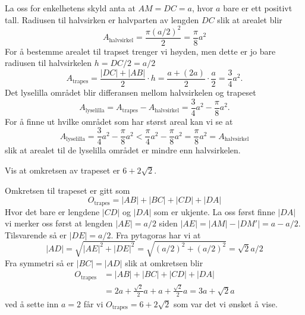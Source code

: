 \begin{losninger}
    La oss for enkelhetens skyld anta at $AM = DC = a$, hvor $a$ bare er ett
    positivt tall. Radiusen til halvsirken er halvparten av lengden $DC$ slik
    at arealet blir
    \begin{equation*}
          A_{\text{halvsirkel}}
        = \frac{\pi (a/2)^2}{2}
        = \frac{\pi}{8} a^2
    \end{equation*}
    For å bestemme arealet til trapset trenger vi høyden, men dette er jo bare
    radiusen til halvsirkelen $h = DC/2 = a/2$
    \begin{equation*}
        A_{\text{trapes}}
        = \frac{|DC| + |AB|}{2} \cdot h
        = \frac{a + (2a)}{2} \cdot \frac{a}{2}
        = \frac{3}{4}a^2.
    \end{equation*}
    Det lyselilla området blir differansen mellom halvsirkelen og trapeset
    \begin{equation*}
        A_{\text{lyselilla}}
        = A_{\text{trapes}} - A_{\text{halvsirkel}}
        = \frac{3}{4}a^2 - \frac{\pi}{8} a^2.
    \end{equation*}
    For å finne ut hvilke området som har størst areal kan vi se at
    \begin{equation*}
           A_{\text{lyselilla}}
        = \frac{3}{4}a^2 - \frac{\pi}{8} a^2
        < \frac{\pi}{4}a^2 - \frac{\pi}{8} a^2
        = \frac{\pi}{8} a^2
        =  A_{\text{halvsirkel}}
    \end{equation*}
    slik at arealet til de lyselilla området er mindre enn halvsirkelen.
\end{losninger}

\begin{oppgaver}
     Vis at omkretsen av trapeset er $6 + 2\sqrt{2}$.
\end{oppgaver}

\begin{losninger}
    Omkretsen til trapeset er gitt som
    \begin{equation}
        O_{\text{trapes}} = |AB| + |BC| + |CD| + |DA|
    \end{equation}
    Hvor det bare er lengdene $|CD|$ og $|DA|$ som er ukjente. La oss først
    finne $|DA|$ vi merker oss først at lengden $|AE| = a/2$ siden $|AE| = |AM|
    - |DM'| = a - a/2$.  Tilsvarende så er $|DE| = a/2$. Fra pytagoras har vi at
    \begin{equation}
        |AD|
        = \sqrt{|AE|^2 + |DE|^2}
        = \sqrt{(a/2)^2 + (a/2)^2}
        = \sqrt{2}a/2
    \end{equation}
    Fra symmetri så er $|BC|=|AD|$ slik at omkretsen blir
    \begin{align*}
              O_{\text{trapes}}
        & = |AB| + |BC| + |CD| + |DA| \\
        & =   2a  +   \frac{\sqrt{2}}{2}a + a + \frac{\sqrt{2}}{2}a
          =   3a  + \sqrt{2}a
    \end{align*}
    ved å sette inn $a=2$ får vi $O_{\text{trapes}} = 6 + 2 \sqrt{2}$ som var
    det vi ønsket å vise.
\end{losninger}


